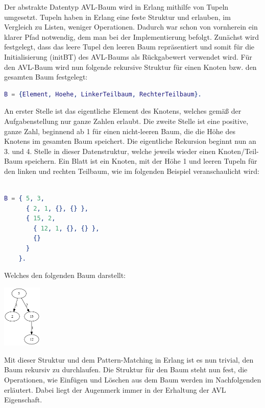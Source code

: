 \documentclass{article}
\begin{document}
  	Der abstrakte Datentyp AVL-Baum wird in Erlang mithilfe von Tupeln umgesetzt. Tupeln haben in Erlang eine feste Struktur und erlauben, im Vergleich zu Listen, weniger Operationen. Dadurch war schon von vornherein ein klarer Pfad notwendig, dem man bei der Implementierung befolgt. Zunächst wird festgelegt, dass das leere Tupel den leeren Baum repräsentiert und somit für die Initialisierung (initBT) des AVL-Baums als Rückgabewert verwendet wird. 
    \newline
    \newline
    Für den AVL-Baum wird nun folgende rekursive Struktur für einen Knoten bzw. den gesamten Baum festgelegt:
    
    \begin{lstlisting}[language=erlang]
B = {Element, Hoehe, LinkerTeilbaum, RechterTeilbaum}.
    \end{lstlisting}
    
	An erster Stelle ist das eigentliche Element des Knotens, welches gemäß der Aufgabenstellung nur ganze Zahlen erlaubt. Die zweite Stelle ist eine positive, ganze Zahl, beginnend ab 1 für einen nicht-leeren Baum, die die Höhe des Knotens im gesamten Baum speichert. Die eigentliche Rekursion beginnt nun an 3. und 4. Stelle in dieser Datenstruktur, welche jeweils wieder einen Knoten/Teil-Baum speichern. Ein Blatt ist ein Knoten, mit der Höhe 1 und leeren Tupeln für den linken und rechten Teilbaum, wie im folgenden Beispiel veranschaulicht wird:

    \begin{lstlisting}[language=erlang]

B = { 5, 3, 
      { 2, 1, {}, {} }, 
      { 15, 2, 
        { 12, 1, {}, {} }, 
        {}
      }
    }.

    \end{lstlisting}
    
   	Welches den folgenden Baum darstellt:

	\begin{center}
   	\includegraphics[height=3cm]{1.png}
	\end{center}

	Mit dieser Struktur und dem Pattern-Matching in Erlang ist es nun trivial, den Baum rekursiv zu durchlaufen. Die Struktur für den Baum steht nun fest, die Operationen, wie Einfügen und Löschen aus dem Baum werden im Nachfolgenden erläutert. Dabei liegt der Augenmerk immer in der Erhaltung der AVL Eigenschaft.
\end{document}
